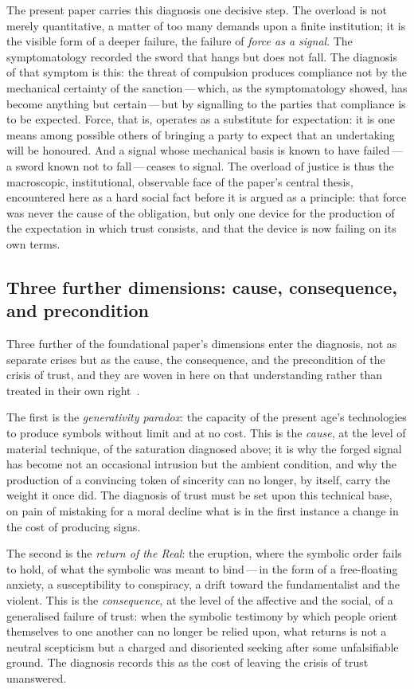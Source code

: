 The present paper carries this diagnosis one decisive step. The overload is not merely quantitative, a matter of too many demands upon a finite institution; it is the visible form of a deeper failure, the failure of \emph{force as a signal}. The symptomatology recorded the sword that hangs but does not fall. The diagnosis of that symptom is this: the threat of compulsion produces compliance not by the mechanical certainty of the sanction\,---\,which, as the symptomatology showed, has become anything but certain\,---\,but by signalling to the parties that compliance is to be expected. Force, that is, operates as a substitute for expectation: it is one means among possible others of bringing a party to expect that an undertaking will be honoured. And a signal whose mechanical basis is known to have failed\,---\,a sword known not to fall\,---\,ceases to signal. The overload of justice is thus the macroscopic, institutional, observable face of the paper's central thesis, encountered here as a hard social fact before it is argued as a principle: that force was never the cause of the obligation, but only one device for the production of the expectation in which trust consists, and that the device is now failing on its own terms.

\subsection{Three further dimensions: cause, consequence, and precondition}
\label{p13:sub:diag-three}

Three further of the foundational paper's dimensions enter the diagnosis, not as separate crises but as the cause, the consequence, and the precondition of the crisis of trust, and they are woven in here on that understanding rather than treated in their own right~\parencite{wanhong_grb}.

The first is the \emph{generativity paradox}: the capacity of the present age's technologies to produce symbols without limit and at no cost. This is the \emph{cause}, at the level of material technique, of the saturation diagnosed above; it is why the forged signal has become not an occasional intrusion but the ambient condition, and why the production of a convincing token of sincerity can no longer, by itself, carry the weight it once did. The diagnosis of trust must be set upon this technical base, on pain of mistaking for a moral decline what is in the first instance a change in the cost of producing signs.

The second is the \emph{return of the Real}: the eruption, where the symbolic order fails to hold, of what the symbolic was meant to bind\,---\,in the form of a free-floating anxiety, a susceptibility to conspiracy, a drift toward the fundamentalist and the violent. This is the \emph{consequence}, at the level of the affective and the social, of a generalised failure of trust: when the symbolic testimony by which people orient themselves to one another can no longer be relied upon, what returns is not a neutral scepticism but a charged and disoriented seeking after some unfalsifiable ground. The diagnosis records this as the cost of leaving the crisis of trust unanswered.

